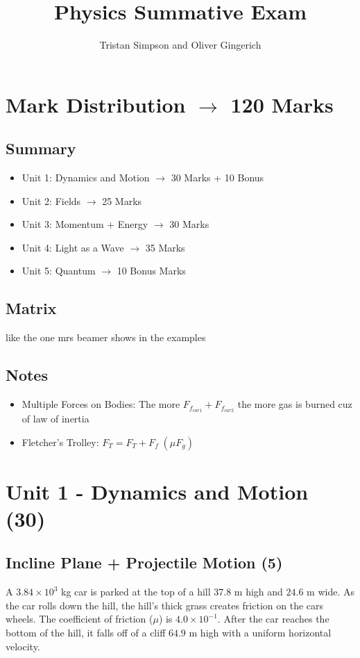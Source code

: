 \documentclass{article}
\title{Physics Summative Exam}
\author{Tristan Simpson and Oliver Gingerich}
\begin{document}
\maketitle
\tableofcontents
\doublespacing

\section{Mark Distribution $\to$ 120 Marks}
\subsection{Summary}
\begin{itemize}
    \item Unit 1: Dynamics and Motion $\to$ 30 Marks + 10 Bonus
    \item Unit 2: Fields $\to$ 25 Marks
    \item Unit 3: Momentum + Energy $\to$ 30 Marks
    \item Unit 4: Light as a Wave $\to$ 35 Marks
    \item Unit 5: Quantum $\to$ 10 Bonus Marks
\end{itemize}

\subsection{Matrix}
like the one mrs beamer shows in the examples

\subsection{Notes}
\begin{itemize}
    \item Multiple Forces on Bodies: The more $F_{f_{car1}} + F_{f_{car2}}$ the more gas is burned cuz of law of inertia
    \item Fletcher's Trolley: $F_T = F_T + F_f\;(\mu F_g)$
\end{itemize}

\section{Unit 1 - Dynamics and Motion (30)}
\subsection{Incline Plane + Projectile Motion (5)}
A $3.84 \times 10^3$ kg car is parked at the top of a hill $37.8$ m high and $24.6$ m wide.
As the car rolls down the hill, the hill's thick grass creates friction on the cars wheels. The coefficient of
friction ($\mu$) is $4.0\times 10^{-1}$. After the car reaches the bottom of the hill, it falls
off of a cliff $64.9$ m high with a uniform horizontal velocity.
\end{document}
